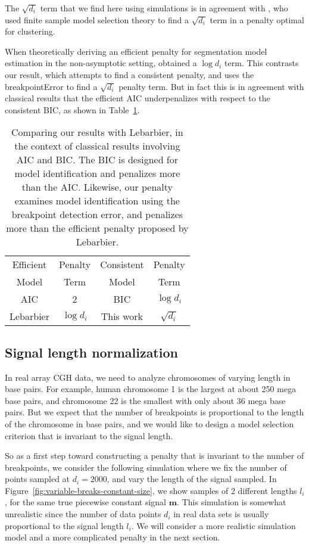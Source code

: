 \documentclass{jsfds} %
\begin{document}
The $\sqrt{d_i}$ term that we find here using simulations is in
agreement with \citet{aurelie}, who used finite sample model selection
theory to find a $\sqrt{d_i}$ term in a penalty optimal for
clustering.

When theoretically deriving an efficient penalty for segmentation
model estimation in the non-asymptotic setting, \citet{lebarbier}
obtained a $\log d_i$ term. This contrasts our result, which attempts
to find a consistent penalty, and uses the breakpointError to find a
$\sqrt{d_i}$ penalty term. But in fact this is in agreement with
classical results that the efficient AIC underpenalizes with respect
to the consistent BIC, as shown in Table~\ref{tab:AIC-BIC}.

\begin{table}[H]
  \centering
  \begin{tabular}{cc|cc}
     Efficient & Penalty & Consistent & Penalty \\
     Model & Term & Model & Term\\
     \hline
     AIC & 2 & BIC & $\log d_i$\\
     Lebarbier & $\log d_i$ & This work & $\sqrt{d_i}$\\
  \end{tabular}
  \caption{Comparing our results with Lebarbier, 
in the context of classical results involving AIC and BIC. 
The BIC is designed for model identification and penalizes more than the AIC.
Likewise, our penalty examines model identification using the breakpoint
detection error, and penalizes more than the efficient penalty proposed
by Lebarbier.}
  \label{tab:AIC-BIC}
\end{table}



\newpage
\subsection{Signal length normalization}
\label{variable_size}
In real array CGH data, we need to analyze chromosomes of varying length
in base pairs. For example, human chromosome 1 is the largest at about
250 mega base pairs, and chromosome 22 is the smallest with only about
36 mega base pairs. But we expect that the number of breakpoints is
proportional to the length of the chromosome in base pairs, and we would
like to design a model selection criterion that is invariant to the
signal length.

So as a first step toward constructing a penalty that is invariant to
the number of breakpoints, we consider the following simulation where
we fix the number of points sampled at $d_i=2000$, and vary the length
of the signal sampled. In
Figure~\ref{fig:variable-breaks-constant-size}, we show samples of 2
different lengths $l_i$, for the same true piecewise constant signal
$\mathbf m$. This simulation is somewhat unrealistic since the number
of data points $d_i$ in real data sets is usually proportional to the
signal length $l_i$. We will consider a more realistic simulation
model and a more complicated penalty in the next section.
\end{document}
